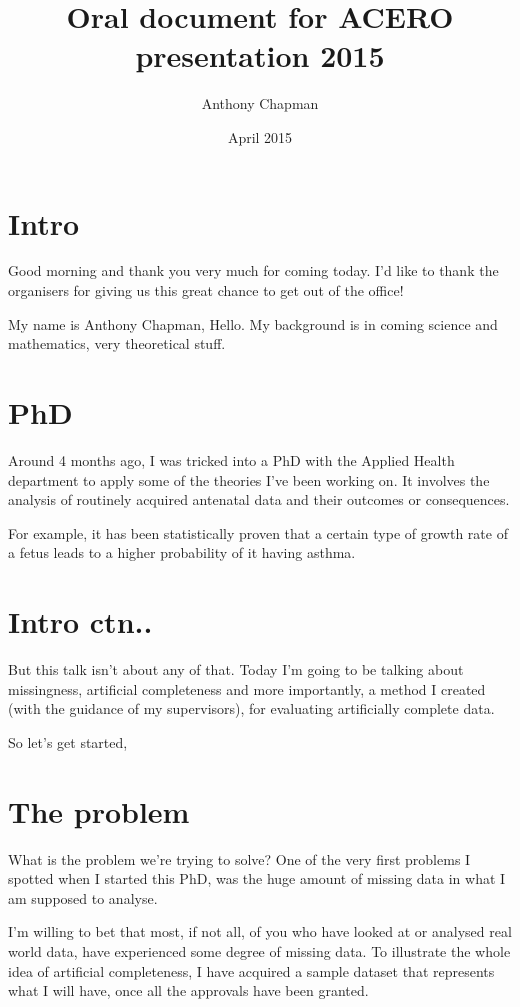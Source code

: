 \documentclass{report}
\title{Oral document for ACERO presentation 2015}
\author{Anthony Chapman}
\date{April 2015}
\begin{document}
\maketitle 

\section*{Intro}
Good morning and thank you very much for coming today. I'd like to thank the organisers for giving us this great chance to get out of the office! 

My name is Anthony Chapman, Hello. My background is in coming science and mathematics, very theoretical stuff. 

\section*{PhD}
Around 4 months ago, I was tricked into a PhD with the Applied Health department to apply some of the theories I've been working on. It involves the analysis of routinely acquired antenatal data and their outcomes or consequences. 

For example, it has been statistically proven that a certain type of growth rate of a fetus leads to a higher probability of it having asthma. 

\section*{Intro ctn..}
But this talk isn't about any of that. Today I'm going to be talking about missingness, artificial completeness and more importantly, a method I created (with the guidance of my supervisors), for evaluating artificially complete data. 

So let's get started,

\section*{The problem}
What is the problem we're trying to solve? One of the very first problems I spotted when I started this PhD, was the huge amount of missing data in what I am supposed to analyse. 

I'm willing to bet that most, if not all, of you who have looked at or analysed real world data, have experienced some degree of missing data. To illustrate the whole idea of artificial completeness, I have acquired a sample dataset that represents what I will have, once all the approvals have been granted. 
\end{document}
